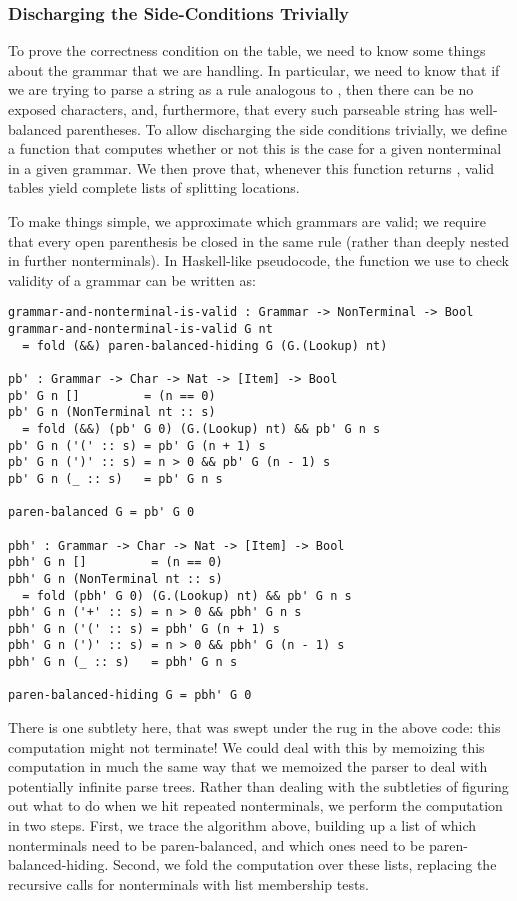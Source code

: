   \subsubsection{Discharging the Side-Conditions Trivially}
    To prove the correctness condition on the table, we need to know some things about the grammar that we are handling.  In particular, we need to know that if we are trying to parse a string as a rule analogous to , then there can be no exposed \terminal{+} characters, and, furthermore, that every such parseable string has well-balanced parentheses.  To allow discharging the side conditions trivially, we define a function that computes whether or not this is the case for a given nonterminal in a given grammar.  We then prove that, whenever this function returns \true, valid tables yield complete lists of splitting locations.
    
    To make things simple, we approximate which grammars are valid; we require that every open parenthesis be closed in the same rule (rather than deeply nested in further nonterminals).  In Haskell-like pseudocode, the function we use to check validity of a grammar can be written as:
\begin{verbatim}
grammar-and-nonterminal-is-valid : Grammar -> NonTerminal -> Bool
grammar-and-nonterminal-is-valid G nt
  = fold (&&) paren-balanced-hiding G (G.(Lookup) nt)

pb' : Grammar -> Char -> Nat -> [Item] -> Bool
pb' G n []         = (n == 0)
pb' G n (NonTerminal nt :: s)
  = fold (&&) (pb' G 0) (G.(Lookup) nt) && pb' G n s
pb' G n ('(' :: s) = pb' G (n + 1) s
pb' G n (')' :: s) = n > 0 && pb' G (n - 1) s
pb' G n (_ :: s)   = pb' G n s

paren-balanced G = pb' G 0

pbh' : Grammar -> Char -> Nat -> [Item] -> Bool
pbh' G n []         = (n == 0)
pbh' G n (NonTerminal nt :: s)
  = fold (pbh' G 0) (G.(Lookup) nt) && pb' G n s
pbh' G n ('+' :: s) = n > 0 && pbh' G n s
pbh' G n ('(' :: s) = pbh' G (n + 1) s
pbh' G n (')' :: s) = n > 0 && pbh' G (n - 1) s
pbh' G n (_ :: s)   = pbh' G n s

paren-balanced-hiding G = pbh' G 0
\end{verbatim}    
    
    There is one subtlety here, that was swept under the rug in the above code: this computation might not terminate!  We could deal with this by memoizing this computation in much the same way that we memoized the parser to deal with potentially infinite parse trees.  Rather than dealing with the subtleties of figuring out what to do when we hit repeated nonterminals, we perform the computation in two steps.  First, we trace the algorithm above, building up a list of which nonterminals need to be paren-balanced, and which ones need to be paren-balanced-hiding.  Second, we fold the computation over these lists, replacing the recursive calls for nonterminals with list membership tests. 
    
